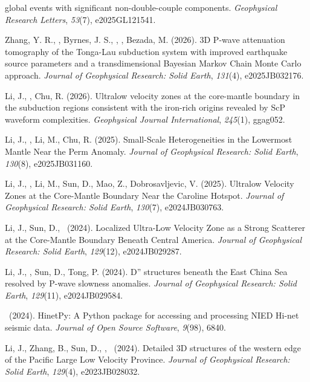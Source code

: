 \begin{etaremune}
    global events with significant non-double-couple components.
    \emph{Geophysical Research Letters}, \emph{53}(7), e2025GL121541.
\item Zhang, Y. R.\CS, \SWei\CS, Byrnes, J. S., \Me, \FWang, Bezada, M. (2026).
    3D P-wave attenuation tomography of the Tonga-Lau subduction system with improved
    earthquake source parameters and a transdimensional Bayesian Markov Chain Monte Carlo approach.
    \emph{Journal of Geophysical Research: Solid Earth}, \emph{131}(4), e2025JB032176.
\item Li, J.\CS, \Me, Chu, R. (2026).
    Ultralow velocity zones at the core-mantle boundary in the subduction regions
    consistent with the iron-rich origins revealed by ScP waveform complexities.
    \emph{Geophysical Journal International}, \emph{245}(1), ggag052.
\item Li, J.\CS, \Me, Li, M., Chu, R. (2025).
	Small-Scale Heterogeneities in the Lowermost Mantle Near the Perm Anomaly.
	\emph{Journal of Geophysical Research: Solid Earth}, \emph{130}(8), e2025JB031160.
\item Li, J.\CS, \Me\CS, Li, M., Sun, D., Mao, Z., Dobrosavljevic, V. (2025).
    Ultralow Velocity Zones at the Core-Mantle Boundary Near the Caroline Hotspot.
    \emph{Journal of Geophysical Research: Solid Earth}, \emph{130}(7), e2024JB030763.
\item Li, J.\CS, Sun, D., \Me\ (2024).
    Localized Ultra-Low Velocity Zone as a Strong Scatterer at the Core-Mantle Boundary Beneath Central America.
    \emph{Journal of Geophysical Research: Solid Earth}, \emph{129}(12), e2024JB029287.
\item Li, J.\CS, \Me, Sun, D., Tong, P. (2024).
    D'' structures beneath the East China Sea resolved by P-wave slowness anomalies.
    \emph{Journal of Geophysical Research: Solid Earth}, \emph{129}(11), e2024JB029584.
\item \Me\ (2024).
    HinetPy: A Python package for accessing and processing NIED Hi-net seismic data.
    \emph{Journal of Open Source Software}, \emph{9}(98), 6840.
\item Li, J.\CS, Zhang, B., Sun, D., \Me, \JYao\ (2024).
    Detailed 3D structures of the western edge of the Pacific Large Low Velocity Province.
    \emph{Journal of Geophysical Research: Solid Earth}, \emph{129}(4), e2023JB028032.

\end{etaremune}

